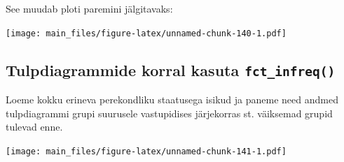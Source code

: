 \documentclass[]{book}
\newenvironment{Shaded}{\begin{snugshade}}{\end{snugshade}}
\newcommand{\KeywordTok}[1]{\textcolor[rgb]{0.13,0.29,0.53}{\textbf{#1}}}
\newcommand{\DataTypeTok}[1]{\textcolor[rgb]{0.13,0.29,0.53}{#1}}
\newcommand{\StringTok}[1]{\textcolor[rgb]{0.31,0.60,0.02}{#1}}
\newcommand{\OperatorTok}[1]{\textcolor[rgb]{0.81,0.36,0.00}{\textbf{#1}}}
\newcommand{\NormalTok}[1]{#1}
\begin{document}
See muudab ploti paremini jälgitavaks:

\begin{Shaded}
\end{Shaded}

\texttt{[image: main\_files/figure-latex/unnamed-chunk-140-1.pdf]}

\subsection{\texorpdfstring{Tulpdiagrammide korral kasuta
\texttt{fct\_infreq()}}{Tulpdiagrammide korral kasuta fct\_infreq()}}\label{tulpdiagrammide-korral-kasuta-fct_infreq}

Loeme kokku erineva perekondliku staatusega isikud ja paneme need andmed
tulpdiagrammi grupi suurusele vastupidises järjekorras st. väiksemad
grupid tulevad enne.

\begin{Shaded}
\end{Shaded}

\texttt{[image: main\_files/figure-latex/unnamed-chunk-141-1.pdf]}


\end{document}
